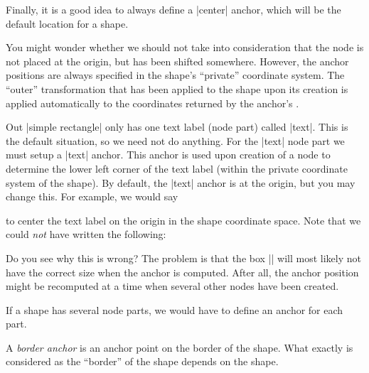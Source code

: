 \begin{command}{\pgfdeclareshape{}}
\begin{command}{\anchor{}}
    Finally, it is a good idea to always define a |center| anchor,
    which will be the default location for a shape.

\begin{codeexample}
\end{codeexample}

    You might wonder whether we should not take into consideration
    that the node is not placed at the origin, but has been shifted
    somewhere. However, the anchor positions are always specified in
    the shape's ``private'' coordinate system. The ``outer''
    transformation that has been applied to the shape upon its
    creation is applied automatically to the coordinates returned by
    the anchor's .

    Out |simple rectangle| only has one text label (node
    part) called |text|. This is the default situation, so we need not
    do anything. For the |text| node part we must setup a |text|
    anchor. This   anchor is used upon creation of a node to determine
    the lower left  corner of the text label (within the private
    coordinate system of the shape). By default, the |text| anchor is
    at the origin, but you may change this. For example, we would say
\begin{codeexample}
\end{codeexample}
    to center the text label on the origin in the shape coordinate
    space. Note that we could \emph{not} have written the following:
    
\begin{codeexample}
\end{codeexample}
    Do you see why this is wrong? The problem is that the box
    |\pgfnodeparttextbox| will most likely not have the correct size
    when the anchor is computed. After all, the anchor position might
    be recomputed at a time when several other nodes have been created. 

    If a shape has several node parts, we would have to define an
    anchor for each part.    
  \end{command}  
  \begin{command}{\anchorborder{}}
    A \emph{border anchor} is an anchor point on the border of the
    shape. What exactly is considered as the ``border'' of the shape
    depends on the shape.


\end{command}
\end{command}
